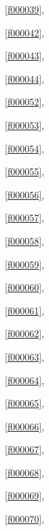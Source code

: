\noindent\filesourcenumbernameone\ \ref{f000039},\ \pageref{f000039}%

\noindent\filesourcenumbernameone\ \ref{f000042},\ \pageref{f000042}%

\noindent\filesourcenumbernameone\ \ref{f000043},\ \pageref{f000043}%

\noindent\filesourcenumbernameone\ \ref{f000044},\ \pageref{f000044}%

\noindent\filesourcenumbernameone\ \ref{f000052},\ \pageref{f000052}%

\noindent\filesourcenumbernameone\ \ref{f000053},\ \pageref{f000053}%

\noindent\filesourcenumbernameone\ \ref{f000054},\ \pageref{f000054}%

\noindent\filesourcenumbernameone\ \ref{f000055},\ \pageref{f000055}%

\noindent\filesourcenumbernameone\ \ref{f000056},\ \pageref{f000056}%

\noindent\filesourcenumbernameone\ \ref{f000057},\ \pageref{f000057}%

\noindent\filesourcenumbernameone\ \ref{f000058},\ \pageref{f000058}%

\noindent\filesourcenumbernameone\ \ref{f000059},\ \pageref{f000059}%

\noindent\filesourcenumbernameone\ \ref{f000060},\ \pageref{f000060}%

\noindent\filesourcenumbernameone\ \ref{f000061},\ \pageref{f000061}%

\noindent\filesourcenumbernameone\ \ref{f000062},\ \pageref{f000062}%

\noindent\filesourcenumbernameone\ \ref{f000063},\ \pageref{f000063}%

\noindent\filesourcenumbernameone\ \ref{f000064},\ \pageref{f000064}%

\noindent\filesourcenumbernameone\ \ref{f000065},\ \pageref{f000065}%

\noindent\filesourcenumbernameone\ \ref{f000066},\ \pageref{f000066}%

\noindent\filesourcenumbernameone\ \ref{f000067},\ \pageref{f000067}%

\noindent\filesourcenumbernameone\ \ref{f000068},\ \pageref{f000068}%

\noindent\filesourcenumbernameone\ \ref{f000069},\ \pageref{f000069}%

\noindent\filesourcenumbernameone\ \ref{f000070},\ \pageref{f000070}%

